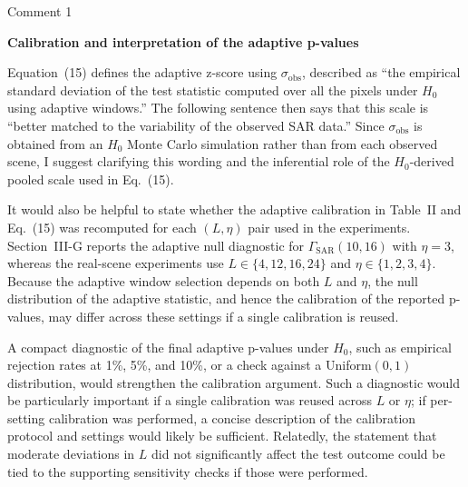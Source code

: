 \documentclass[11pt]{report}
\begin{document}
\begin{reviewbox}{Comment 1}

\textbf{Calibration and interpretation of the adaptive p-values}

Equation~(15) defines the adaptive z-score using $\sigma_{\mathrm{obs}}$, described as ``the empirical standard deviation of the test statistic computed over all the pixels under $H_0$ using adaptive windows.'' The following sentence then says that this scale is ``better matched to the variability of the observed SAR data.'' Since $\sigma_{\mathrm{obs}}$ is obtained from an $H_0$ Monte Carlo simulation rather than from each observed scene, I suggest clarifying this wording and the inferential role of the $H_0$-derived pooled scale used in Eq.~(15).
\vspace{1em}

It would also be helpful to state whether the adaptive calibration in Table~II and Eq.~(15) was recomputed for each $(L,\eta)$ pair used in the experiments. Section~III-G reports the adaptive null diagnostic for $\Gamma_{\mathrm{SAR}}(10,16)$ with $\eta = 3$, whereas the real-scene experiments use $L \in \{4,12,16,24\}$ and $\eta \in \{1,2,3,4\}$. Because the adaptive window selection depends on both $L$ and $\eta$, the null distribution of the adaptive statistic, and hence the calibration of the reported p-values, may differ across these settings if a single calibration is reused.

\vspace{1em}
A compact diagnostic of the final adaptive p-values under $H_0$, such as empirical rejection rates at 1\%, 5\%, and 10\%, or a check against a Uniform$(0,1)$ distribution, would strengthen the calibration argument. Such a diagnostic would be particularly important if a single calibration was reused across $L$ or $\eta$; if per-setting calibration was performed, a concise description of the calibration protocol and settings would likely be sufficient. Relatedly, the statement that moderate deviations in $L$ did not significantly affect the test outcome could be tied to the supporting sensitivity checks if those were performed.

\end{reviewbox}
\end{document}
